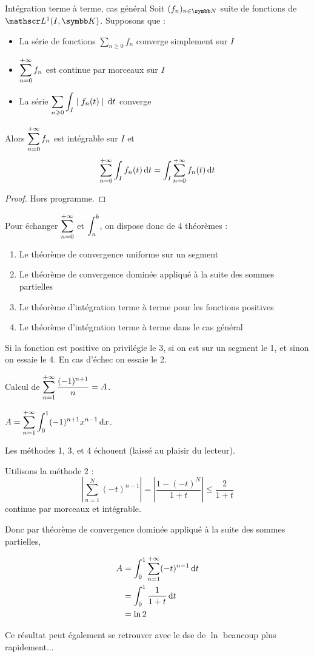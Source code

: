 \begin{theoreme}{Intégration terme à terme, cas général}{}
    Soit $(f_n)_{n \in \N}$ suite de fonctions de $\mathscr L^1(I, \K)$. Supposons que :
    \begin{itemize}
        \item La série de fonctions $\sum_{n \geqslant 0} f_n$ converge simplement sur $I$
        \item $\displaystyle \sum_{n = 0}^{+ \infty} f_n$ est continue par morceaux sur $I$
        \item La série $\displaystyle \sum_{n \geqslant 0 } \int_I \mid f_n(t) \mid \,\mathrm{d}t$ converge
    \end{itemize}
    Alors $\displaystyle \sum_{n = 0 }^{+ \infty} f_n$ est intégrable sur $I$ et 
    $$\sum_{n = 0}^{+ \infty} \int_I f_n(t) \,\mathrm{d}t = \int_I \sum_{n = 0}^{+ \infty} f_n(t) \,\mathrm{d}t$$
\end{theoreme}

\begin{proof}
    Hors programme. 
\end{proof}

Pour échanger $\displaystyle \sum_{n = 0}^{+ \infty}$ et $\displaystyle \int_a^b$, on dispose donc de 4 théorèmes : 
\begin{enumerate}
    \item Le théorème de convergence uniforme sur un segment 
    \item Le théorème de convergence dominée appliqué à la suite des sommes partielles
    \item Le théorème d'intégration terme à terme pour les fonctions positives
    \item Le théorème d'intégration terme à terme dans le cas général
\end{enumerate}

Si la fonction est positive on privilégie le 3, si on est sur un segment le 1, et sinon 
on essaie le 4. En cas d'échec on essaie le 2. 

\begin{exemple}
    Calcul de $\displaystyle \sum_{n = 1}^{+ \infty} \frac{(-1)^{n + 1}}{n} = A$. 

    $A = \displaystyle \sum_{n = 1}^{+\infty} \int_{0}^{1} (-1)^{n + 1} x^{n - 1} \,\mathrm{d}x$. 

    Les méthodes 1, 3, et 4 échouent (laissé au plaisir du lecteur).

    Utilisons la méthode 2 : 
    $$ \left| \sum_{n = 1}^{N } (-t)^{n - 1} \right| = \left| \frac{1 - (-t)^N}{1 + t} \right| \leqslant \frac{2}{1 + t}$$
    continue par morceaux et intégrable. 

    Donc par théorème de convergence dominée appliqué à la suite des sommes partielles, 

    \begin{align}
        A & = \int_{0}^{1} \sum_{n = 1}^{+\infty} (-t)^{n - 1} \,\mathrm{d}t \\
        & = \int_0^1 \frac{1}{1 + t} \,\mathrm{d}t \\
        & = \ln 2
    \end{align}

    Ce résultat peut également se retrouver avec le dse de $\ln$ beaucoup plus rapidement...
\end{exemple}

